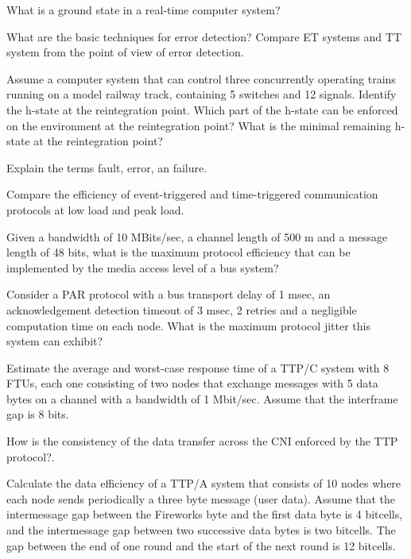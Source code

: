 
 What is a ground state in a real-time computer system?
\pagebreak


What are the basic techniques for error detection? Compare ET systems and TT system
from the point of view of error detection.


Assume a computer system that can control three concurrently operating trains running on a
model railway track, containing 5 switches and 12 signals.
Identify the h-state at the reintegration point. Which part of the h-state can be enforced on
the environment at the reintegration point? What is the minimal remaining h-state at the
reintegration point?


Explain the terms fault, error, an failure.


Compare the efficiency of event-triggered and time-triggered communication protocols at
low load and peak load.


Given a bandwidth of 10 MBits/sec, a channel length of 500 m and a message length of 48
bits, what is the maximum protocol efficiency that can be implemented by the media access
level of a bus system?



Consider a PAR protocol with a bus transport delay of 1 msec, an acknowledgement
detection timeout of 3 msec, 2 retries and a negligible computation time on each node. What
is the maximum protocol jitter this system can exhibit?


 Estimate the average and worst-case response time of a TTP/C system with 8 FTUs, each
one consisting of two nodes that exchange messages with 5 data bytes on a channel with a
bandwidth of 1 Mbit/sec. Assume that the interframe gap is 8 bits.


How is the consistency of the data transfer across the CNI enforced by the TTP protocol?.

Calculate the data efficiency of a TTP/A system that consists of 10 nodes where each node
sends periodically a three byte message (user data). Assume that the intermessage gap
between the Fireworks byte and the first data byte is 4 bitcells, and the intermessage gap
between two successive data bytes is two bitcells. The gap between the end of one round
and the start of the next round is 12 bitcells.

